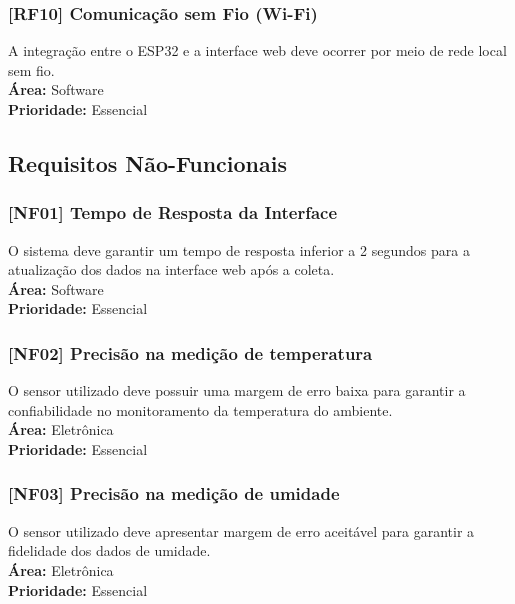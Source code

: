 \subsubsection{[RF10] Comunicação sem Fio (Wi-Fi)}
A integração entre o ESP32 e a interface web deve ocorrer por meio de rede local sem fio. \\
\textbf{Área:} Software \\
\textbf{Prioridade:} Essencial

\subsection{Requisitos Não-Funcionais}
\subsubsection{[NF01] Tempo de Resposta da Interface}
O sistema deve garantir um tempo de resposta inferior a 2 segundos para a atualização dos dados na interface web após a coleta. \\
\textbf{Área:} Software \\
\textbf{Prioridade:} Essencial

\subsubsection{[NF02] Precisão na medição de temperatura}
O sensor utilizado deve possuir uma margem de erro baixa para garantir a confiabilidade no monitoramento da temperatura do ambiente. \\
\textbf{Área:} Eletrônica \\
\textbf{Prioridade:} Essencial

\subsubsection{[NF03] Precisão na medição de umidade}
O sensor utilizado deve apresentar margem de erro aceitável para garantir a fidelidade dos dados de umidade. \\
\textbf{Área:} Eletrônica \\
\textbf{Prioridade:} Essencial